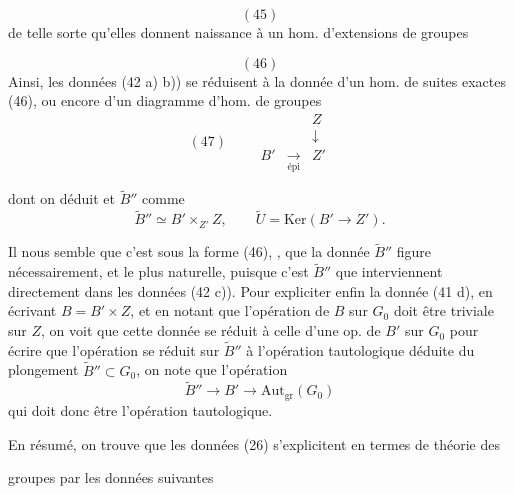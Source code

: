 \documentclass[11pt,a4paper]{article}
\begin{document}
\[
(45)
\]
de telle sorte qu'elles  donnent naissance à un hom. d'extensions de groupes


\[
(46)
\]
Ainsi, les données (42 a) b)) se réduisent à la donnée d'un hom. de suites exactes (46), ou encore d'un diagramme d'hom. de groupes
\[
(47)\qquad
\begin{array}{ccc}
 & & Z\\
 & & \downarrow\\
B' & \xrightarrow[\text{épi}]{} & Z'
\end{array}
\]

dont on déduit  \ill{} et $\tilde{B}''$ comme
\[
\tilde{B}''\simeq B'\times_{Z'}Z ,\qquad \tilde{U}=\mathrm{Ker}(B'\to Z'). \tag{48}
\]

 Il nous semble que c'est sous la forme (46),   , que la donnée $\tilde{B}''$ figure   nécessairement, et le plus naturelle, puisque c'est  $\tilde{B}''$ que interviennent directement dans les données (42 c)). Pour expliciter enfin la donnée (41 d), en écrivant $B=B'\times Z$, et en notant que l'opération de $B$ sur $G_0$ doit être triviale sur $Z$, on voit que cette donnée se réduit à celle d'une op. de $B'$ sur $G_0$  pour écrire que  l'opération  se réduit sur $\tilde{B}''$ à l'opération tautologique déduite du plongement $\tilde{B}''\subset G_0$, on note que l'opération 
\[
\tilde{B}''\longrightarrow B'\longrightarrow\mathrm{Aut}_{\mathrm{gr}}(G_0) \tag{49}
\]
qui doit donc être l'opération tautologique.

En résumé, on trouve que les données (26) s'explicitent en termes de théorie des

groupes par les données suivantes
\end{document}
